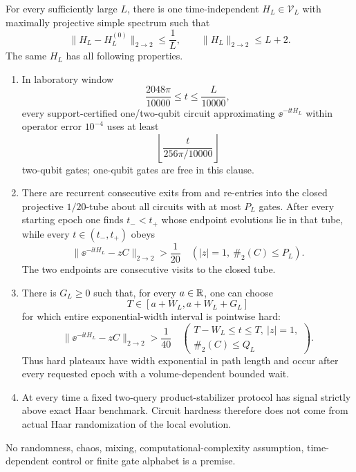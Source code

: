 \begin{theorem}
\label{thm:exponentialplateau}
For every sufficiently large $L$, there is one time-independent
$H_L\in\mathscr V_L$ with maximally projective simple spectrum such that
\begin{equation}
 \|H_L-H_L^{(0)}\|_{2\to2}\le\frac1L,
 \qquad \|H_L\|_{2\to2}\le L+2.                    \label{eq:plateaunorm}
\end{equation}
The same $H_L$ has all following properties.
\begin{enumerate}[leftmargin=1.7em]
\item In laboratory window
\begin{equation}
 \frac{2048\pi}{10000}\le t\le\frac{L}{10000},      \label{eq:plateaurampwindow}
\end{equation}
every support-certified one/two-qubit circuit approximating
$\ee^{-\ii tH_L}$ within operator error $10^{-4}$ uses at least
\begin{equation}
 \left\lfloor\frac{t}{256\pi/10000}\right\rfloor    \label{eq:plateauramp}
\end{equation}
two-qubit gates; one-qubit gates are free in this clause.
\item There are recurrent consecutive exits from and re-entries into the
closed projective $1/20$-tube about all circuits with at most $P_L$ gates.
After every starting epoch one finds $t_-<t_+$ whose endpoint evolutions lie
in that tube, while every $t\in(t_-,t_+)$ obeys
\begin{equation}
 \|\ee^{-\ii tH_L}-zC\|_{2\to2}>\frac1{20}
 \quad(|z|=1,\ \#_2(C)\le P_L).                     \label{eq:plateaufullgap}
\end{equation}
The two endpoints are consecutive visits to the closed tube.
\item There is $G_L\ge0$ such that, for every $a\in\mathbb R$, one can choose
\begin{equation}
 T\in[a+W_L,a+W_L+G_L]                               \label{eq:plateauendpoint}
\end{equation}
for which entire exponential-width interval is pointwise hard:
\begin{equation}
 \|\ee^{-\ii tH_L}-zC\|_{2\to2}>\frac1{40}
 \quad\left(
 \begin{array}{l}
 T-W_L\le t\le T,\ |z|=1,\\[-2pt]
 \#_2(C)\le Q_L
 \end{array}\right).                               \label{eq:exponentialplateau}
\end{equation}
Thus hard plateaux have width exponential in path length and occur after
every requested epoch with a volume-dependent bounded wait.
\item At every time a fixed two-query product-stabilizer protocol has signal
strictly above exact Haar benchmark.  Circuit hardness therefore does not
come from actual Haar randomization of the local evolution.
\end{enumerate}
No randomness, chaos, mixing, computational-complexity assumption,
time-dependent control or finite gate alphabet is a premise.
\end{theorem}

